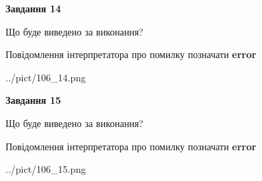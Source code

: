 \documentclass[11pt, ukrainian]{article}
\begin{document}
{\begin {large}
{\begin {center}\textbf{Завдання 14}\end {center}}\par
Що буде виведено за виконання? \par
Повідомлення інтерпретатора про помилку позначати \textbf{error}

\begin{center}
	{../pict/106_14.png}
\end{center}
\newpage

{\begin {center}\textbf{Завдання 15}\end {center}}\par
Що буде виведено за виконання? \par
Повідомлення інтерпретатора про помилку позначати \textbf{error}

\begin{center}
	{../pict/106_15.png}
\end{center}
\newpage

\end {large}}
\end{document}
